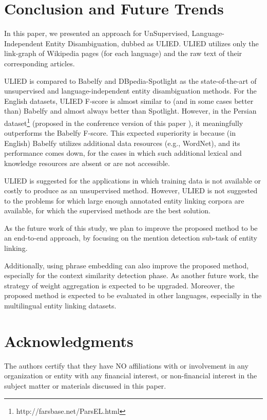 \documentclass{article}
\begin{document}
\section{Conclusion and Future Trends}
In this paper, we presented an approach for UnSupervised, Language-Independent Entity Disambiguation, dubbed as ULIED. ULIED utilizes only the link-graph of Wikipedia pages (for each language) and the raw text of their corresponding articles.


ULIED is compared to Babelfy and DBpedia-Spotlight as the state-of-the-art of unsupervised and language-independent entity disambiguation methods. For the English datasets, ULIED F-score is almost similar to (and in some cases better than) Babelfy and almost always better than Spotlight. However, in the Persian dataset\footnote{http://farsbase.net/ParsEL.html} (proposed in the conference version of this paper \cite{fakhrian2019parsel}), it meaningfully outperforms the Babelfy F-score. This expected superiority is because (in English) Babelfy utilizes additional data resources (e.g., WordNet), and its performance comes down, for the cases in which such additional lexical and knowledge resources are absent or are not accessible.


ULIED is suggested for the applications in which training data is not available or costly to produce as an unsupervised method. However, ULIED is not suggested to the problems for which large enough annotated entity linking corpora are available, for which the supervised methods are the best solution. 


As the future work of this study, we plan to improve the proposed method to be an end-to-end approach, by focusing on the mention detection sub-task of entity linking. 

Additionally, using phrase embedding can also improve the proposed method, especially for the context similarity detection phase. As another future work, the strategy of weight aggregation is expected to be upgraded. Moreover, the proposed method is expected to be evaluated in other languages, especially in the multilingual entity linking datasets.

\section{Acknowledgments}The authors certify that they have NO affiliations with or involvement in any organization or entity with any financial interest, or non-financial interest in the subject matter or materials discussed in this paper.


 


\end{document}
